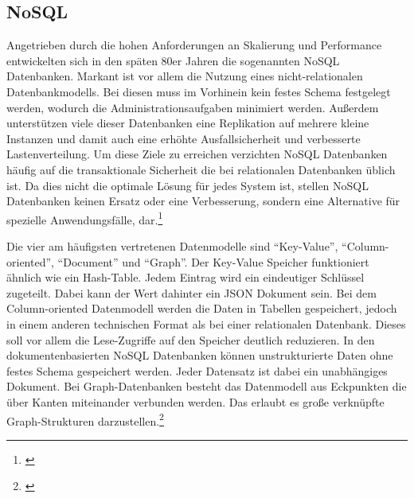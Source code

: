 
\subsection{NoSQL}


Angetrieben durch die hohen Anforderungen an Skalierung und Performance entwickelten sich in den späten 80er Jahren die sogenannten NoSQL Datenbanken. Markant ist vor allem die Nutzung eines nicht-relationalen Datenbankmodells. Bei diesen muss im Vorhinein kein festes Schema festgelegt werden, wodurch die Administrationsaufgaben minimiert werden. Außerdem unterstützen viele dieser Datenbanken eine Replikation auf mehrere kleine Instanzen und damit auch eine erhöhte Ausfallsicherheit und verbesserte Lastenverteilung. Um diese Ziele zu erreichen verzichten NoSQL Datenbanken häufig auf die transaktionale Sicherheit die bei relationalen Datenbanken üblich ist. Da dies nicht die optimale Lösung für jedes System ist, stellen NoSQL Datenbanken keinen Ersatz oder eine Verbesserung, sondern eine Alternative für spezielle Anwendungsfälle, dar.\footnote{\cite[Vgl.][51\psq]{Bagga2021}}

Die vier am häufigsten vertretenen Datenmodelle sind \enquote{Key-Value}, \enquote{Column-oriented}, \enquote{Document} und \enquote{Graph}. Der Key-Value Speicher funktioniert ähnlich wie ein Hash-Table. Jedem Eintrag wird ein eindeutiger Schlüssel zugeteilt. Dabei kann der Wert dahinter ein \gls{JSON} Dokument sein. Bei dem Column-oriented Datenmodell werden die Daten in Tabellen gespeichert, jedoch in einem anderen technischen Format als bei einer relationalen Datenbank. Dieses soll vor allem die Lese-Zugriffe auf den Speicher deutlich reduzieren. In den dokumentenbasierten NoSQL Datenbanken können unstrukturierte Daten ohne festes Schema gespeichert werden. Jeder Datensatz ist dabei ein unabhängiges Dokument. Bei Graph-Datenbanken besteht das Datenmodell aus Eckpunkten die über Kanten miteinander verbunden werden. Das erlaubt es große verknüpfte Graph-Strukturen darzustellen.\footnote{\cite[Vgl.][52\psq]{Bagga2021}}

